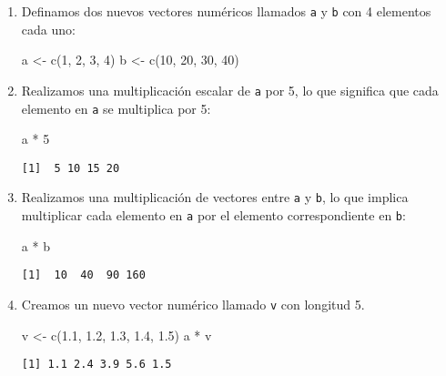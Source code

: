 \documentclass[
  a4paper,
]{article}
\newenvironment{Shaded}{}{}
\newcommand{\DecValTok}[1]{\textcolor[rgb]{0.00,0.36,0.77}{#1}}
\newcommand{\FloatTok}[1]{\textcolor[rgb]{0.00,0.36,0.77}{#1}}
\newcommand{\FunctionTok}[1]{\textcolor[rgb]{0.44,0.26,0.76}{#1}}
\newcommand{\NormalTok}[1]{\textcolor[rgb]{0.14,0.16,0.18}{#1}}
\newcommand{\OtherTok}[1]{\textcolor[rgb]{0.44,0.26,0.76}{#1}}
\newcommand{\SpecialCharTok}[1]{\textcolor[rgb]{0.00,0.36,0.77}{#1}}
\begin{document}
\begin{enumerate}
\def\labelenumi{\arabic{enumi}.}
\item
  Definamos dos nuevos vectores numéricos llamados \texttt{a} y
  \texttt{b} con 4 elementos cada uno:

\begin{Shaded}
\begin{Highlighting}[]
\NormalTok{a }\OtherTok{\textless{}{-}} \FunctionTok{c}\NormalTok{(}\DecValTok{1}\NormalTok{, }\DecValTok{2}\NormalTok{, }\DecValTok{3}\NormalTok{, }\DecValTok{4}\NormalTok{)}
\NormalTok{b }\OtherTok{\textless{}{-}} \FunctionTok{c}\NormalTok{(}\DecValTok{10}\NormalTok{, }\DecValTok{20}\NormalTok{, }\DecValTok{30}\NormalTok{, }\DecValTok{40}\NormalTok{)}
\end{Highlighting}
\end{Shaded}
\item
  Realizamos una multiplicación escalar de \texttt{a} por 5, lo que
  significa que cada elemento en \texttt{a} se multiplica por 5:

\begin{Shaded}
\begin{Highlighting}[]
\NormalTok{a }\SpecialCharTok{*} \DecValTok{5}
\end{Highlighting}
\end{Shaded}

\begin{verbatim}
[1]  5 10 15 20
\end{verbatim}
\item
  Realizamos una multiplicación de vectores entre \texttt{a} y
  \texttt{b}, lo que implica multiplicar cada elemento en \texttt{a} por
  el elemento correspondiente en \texttt{b}:

\begin{Shaded}
\begin{Highlighting}[]
\NormalTok{a }\SpecialCharTok{*}\NormalTok{ b}
\end{Highlighting}
\end{Shaded}

\begin{verbatim}
[1]  10  40  90 160
\end{verbatim}
\item
  Creamos un nuevo vector numérico llamado \texttt{v} con longitud 5.

\begin{Shaded}
\begin{Highlighting}[]
\NormalTok{v }\OtherTok{\textless{}{-}} \FunctionTok{c}\NormalTok{(}\FloatTok{1.1}\NormalTok{, }\FloatTok{1.2}\NormalTok{, }\FloatTok{1.3}\NormalTok{, }\FloatTok{1.4}\NormalTok{, }\FloatTok{1.5}\NormalTok{)}
\NormalTok{a }\SpecialCharTok{*}\NormalTok{ v}
\end{Highlighting}
\end{Shaded}

\begin{verbatim}
[1] 1.1 2.4 3.9 5.6 1.5
\end{verbatim}
\end{enumerate}
\end{document}
